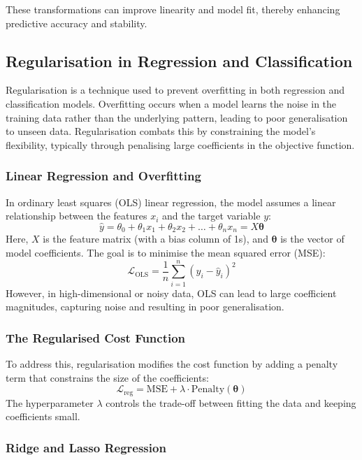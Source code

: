 \documentclass[9pt]{extarticle}
\begin{document}
These transformations can improve linearity and model fit, thereby enhancing predictive accuracy and stability.


\subsection{Regularisation in Regression and Classification}

Regularisation is a technique used to prevent overfitting in both regression and classification models. Overfitting occurs when a model learns the noise in the training data rather than the underlying pattern, leading to poor generalisation to unseen data. Regularisation combats this by constraining the model’s flexibility, typically through penalising large coefficients in the objective function.

\subsubsection*{Linear Regression and Overfitting}

In ordinary least squares (OLS) linear regression, the model assumes a linear relationship between the features $x_i$ and the target variable $y$:
\[
\hat{y} = \theta_0 + \theta_1 x_1 + \theta_2 x_2 + \dots + \theta_n x_n = X\boldsymbol{\theta}
\]
Here, $X$ is the feature matrix (with a bias column of 1s), and $\boldsymbol{\theta}$ is the vector of model coefficients. The goal is to minimise the mean squared error (MSE):
\[
\mathcal{L}_{\text{OLS}} = \frac{1}{n} \sum_{i=1}^n \left(y_i - \hat{y}_i\right)^2
\]
However, in high-dimensional or noisy data, OLS can lead to large coefficient magnitudes, capturing noise and resulting in poor generalisation.

\subsubsection*{The Regularised Cost Function}

To address this, regularisation modifies the cost function by adding a penalty term that constrains the size of the coefficients:
\[
\mathcal{L}_{\text{reg}} = \text{MSE} + \lambda \cdot \text{Penalty}(\boldsymbol{\theta})
\]
The hyperparameter $\lambda$ controls the trade-off between fitting the data and keeping coefficients small.

\subsubsection*{Ridge and Lasso Regression}
\end{document}
